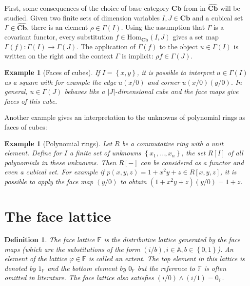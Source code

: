 \documentclass[12pt,a4paper,twoside,xetex]{book} %
\newcommand{\keyword}[1]{\emph{#1}\index{#1}}
\newtheorem{definition}[theorem]{Definition}
\newtheorem{example}[theorem]{Example}
\newcommand{\psh}[1]{\widehat{#1}}
\newcommand{\homo}[3]{\text{Hom}_{#1}\left(#2,#3\right)}
\newcommand{\cube}[0]{\textbf{Cb}}
\begin{document}
First, some consequences of the choice of base category $\cube$ from  in $\psh{\cube}$ will be studied. Given two finite sets of dimension variables $I,J \in \cube$ and a cubical set $\Gamma \in \psh{\cube}$,
there is an element $\rho \in \Gamma (I)$. Using the assumption that $\Gamma$ 
is a covariant functor, every substitution $f \in \homo{\cube}{I}{J}$ 
gives a set map $\Gamma (f) : \Gamma (I) \rightarrow \Gamma (J)$. 
The application of $\Gamma(f)$ to the object $u \in \Gamma (I)$ is written on 
the right and the context $\Gamma$ is implicit: $\rho f \in \Gamma(J)$. 

\begin{example}[Faces of cubes]
If $I = \left\{x,y \right\}$, it is possible to interpret $u \in \Gamma(I)$ as 
a square with for example the edge $u(x/0)$ and corner $u(x/0)(y/0)$. In 
general, $u\in \Gamma (J)$ behaves like a $|J|$-dimensional cube and the face 
maps give faces of this cube.
\end{example}

Another example gives an interpretation to the unknowns of polynomial rings as faces of cubes:

\begin{example}[Polynomial rings]
Let $R$ be a commutative ring with a unit element. Define for $I$ a finite set 
of unknowns $\left\{x_1 , ..., x_n \right\}$, the set $R[I]$ of all polynomials 
in these unknowns. Then $R[-]$ can be considered as a functor and even a 
cubical set. For example if $p(x,y,z) = 1 + x^2y +z \in R[x,y,z]$, it is 
possible to apply the face map $(y/0)$ to obtain $(1+x^2 y +z ) (y/0) = 1+z$.
\end{example}

\section{The face lattice}

\begin{definition}\label{facelattice}
The \keyword{face lattice} $\mathbb{F}$ is the distributive lattice generated 
by the face maps (which are the substitutions of the form $(i/b), i\in 
\mathbb{A}, b \in \left\{ 0,1 \right\}$). An element of the lattice $\varphi 
\in \mathbb{F}$ is called an \keyword{extent}. The top element in this lattice 
is denoted by $1_{\mathbb{F}}$ and the bottom element by $0_{\mathbb{F}}$ but 
the reference to $\mathbb{F}$ is often omitted in literature. The face lattice 
also satisfies $(i/0) \wedge (i/1) = 0_{\mathbb{F}}$. 
\end{definition}
\end{document}
